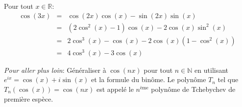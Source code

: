 Pour tout $x\in\mathbb{R}$:
\begin{eqnarray*}
  \cos(3x) &=& \cos(2x)\cos(x)-\sin(2x)\sin(x) \\
      &=& \left( 2\cos^2(x)-1 \right) \cos(x) - 2\cos(x)\sin^2(x) \\
      &=& 2\cos^3(x)-\cos(x)-2\cos(x)\left(1-\cos^2(x)\right) \\
      &=& 4\cos^3(x)-3\cos(x)
\end{eqnarray*}

\textit{Pour aller plus loin}: Généraliser à $\cos(nx)$ pour tout $n\in\mathbb{N}$ en utilisant $e^{ix}=\cos(x)+i\sin(x)$ et la formule du binôme. Le polynôme $T_n$ tel que $T_n\left(\cos(x)\right)=\cos(nx)$ est appelé le $n^{\textrm{ème}}$ polynôme de Tchebychev de première espèce.
